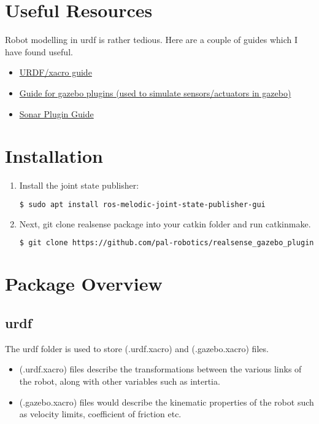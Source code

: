 \documentclass[11pt]{article}
\begin{document}
\section{Useful Resources}
Robot modelling in urdf is rather tedious. Here are a couple of guides which I have found useful.

\begin{itemize}
 \item {
       \href{https://nu-msr.github.io/me495_site/lecture06_modeling.html}{URDF/xacro guide}
       }
 \item{
       \href{   https://classic.gazebosim.org/tutorials?tut=ros_gzplugins}{Guide for gazebo plugins (used to simulate sensors/actuators in gazebo)}
       }
 \item{
       \href{
        https://medium.com/teamarimac/integrating-sonar-and-ir-sensor-plugin-to-robot-model-in-gazebo-with-ros-656fd9452607
       }{Sonar Plugin Guide}
       }
       
       
\end{itemize}


\section{Installation}
\begin{enumerate}
 \item{Install the joint state publisher:
       \begin{lstlisting}[language=bash]
               $ sudo apt install ros-melodic-joint-state-publisher-gui
       \end{lstlisting}
       }
 \item{
       Next, git clone realsense package into your catkin folder and run catkinmake.
       
       \begin{lstlisting}[language=bash]
       $ git clone https://github.com/pal-robotics/realsense_gazebo_plugin.git
       \end{lstlisting}
       }
\end{enumerate}

\section{Package Overview}
\subsection{urdf}
The urdf folder is used to store (.urdf.xacro) and (.gazebo.xacro) files.
\begin{itemize}
 \item {
       (.urdf.xacro) files describe the transformations between the various links of the robot, along with other variables such as intertia.
       }
 \item{
       (.gazebo.xacro) files would describe the kinematic properties of the robot such as velocity limits, coefficient of friction etc.
       }
\end{itemize}
\end{document}
